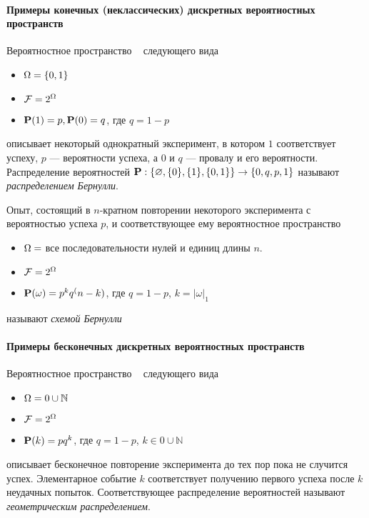 
\paragraph{Примеры конечных (неклассических) дискретных вероятностных пространств}

\begin{example}
	Вероятностное пространство \PSP~ следующего вида
	\begin{itemize}
		\item $\Omega = \{0, 1\}$
		\item $\mathcal{F} = 2^{\Omega}$
		\item $\mathbf{P}(1) = p, \mathbf{P}(0) = q$, где $q = 1 - p$
	\end{itemize}
	описывает некоторый однократный эксперимент, в котором $1$ соответствует успеху, $p$ --- вероятности успеха, а $0$ и $q$ --- провалу и его вероятности. Распределение вероятностей $\mathbf{P}: \{\varnothing, \{0\}, \{1\}, \{0, 1\}\} \rightarrow \{0, q, p, 1\}$ называют {\it распределением Бернулли}.
\end{example}

\begin{example}
	Опыт, состоящий в $n$-кратном повторении некоторого эксперимента с вероятностью успеха $p$, и соответствующее ему вероятностное пространство
	\begin{itemize}
		\item $\Omega = $ все последовательности нулей и единиц длины $n$.
		\item $\mathcal{F} = 2^{\Omega}$
		\item $\mathbf{P}(\omega) = p^k q^(n-k)$, где $q = 1 - p$, $k = |\omega|_1$
	\end{itemize}
	называют {\it схемой Бернулли}
\end{example}



\paragraph{Примеры бесконечных дискретных вероятностных пространств}

\begin{example}
	Вероятностное пространство \PSP~ следующего вида
	\begin{itemize}
		\item $\Omega = 0 \cup \mathbb N$
		\item $\mathcal{F} = 2^{\Omega}$
		\item $\mathbf{P}(k) = p q^k$, где $q = 1 - p$, $k \in 0 \cup \mathbb N$
	\end{itemize}
	описывает бесконечное повторение эксперимента до тех пор пока не случится успех. Элементарное событие $k$ соответствует получению первого успеха после $k$ неудачных попыток. Соответствующее распределение вероятностей называют {\it геометрическим распределением}.
\end{example}


